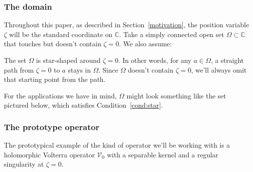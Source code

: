 \documentclass{article}
\makeatletter
\theoremstyle{plain}
\newcommand{\cond}[1]{\item[(\textsc{#1})]\protected@edef\@currentlabel{\textsc{#1}}}
\newcommand{\C}{\mathbb{C}}
\newcommand{\hardpart}{\mathcal{V}_0}
\newcommand{\domain}{\Omega}
\makeatother
\begin{document}
\subsubsection{The domain}\label{setting:domain}
Throughout this paper, as described in Section~\ref{motivation}, the position variable $\zeta$ will be the standard coordinate on $\C$. Take a simply connected open set $\domain \subset \C$ that touches but doesn't contain $\zeta = 0$. We also assume:
\begin{conditions}
\cond{star}\label{cond:star} The set $\domain$ is star-shaped around $\zeta = 0$. In other words, for any $a \in \domain$, a straight path from $\zeta = 0$ to $a$ stays in $\domain$. Since $\domain$ doesn't contain $\zeta = 0$, we'll always omit that starting point from the path.
\end{conditions}
For the applications we have in mind, $\domain$ might look something like the set pictured below, which satisfies Condition~\eqref{cond:star}.
\begin{center}
\end{center}
\subsubsection{The prototype operator}\label{setting:basic}
The prototypical example of the kind of operator we'll be working with is a holomorphic Volterra operator $\hardpart$ with a separable kernel and a regular singularity at $\zeta = 0$.
\end{document}
